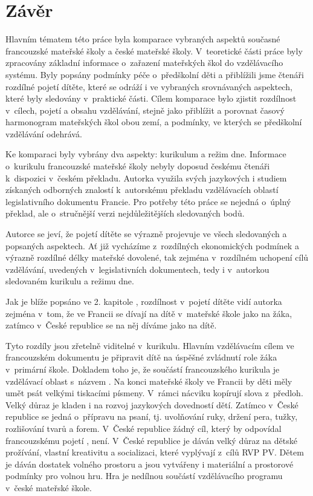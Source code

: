 \chapter*{Závěr}
Hlavním tématem této práce byla komparace vybraných aspektů současné francouzské mateřské školy a české mateřské školy. V~teoretické části práce byly zpracovány základní informace o~zařazení mateřských škol do vzdělávacího systému. Byly popsány podmínky péče o~předškolní děti a přiblížili jsme čtenáři rozdílné pojetí dítěte, které se odráží i ve vybraných srovnávaných aspektech, které byly sledovány v~praktické části. Cílem komparace bylo zjistit rozdílnost v~cílech, pojetí a obsahu vzdělávání, stejně jako přiblížit a porovnat časový harmonogram mateřských škol obou zemí, a podmínky, ve kterých se předškolní vzdělávání odehrává.  

Ke komparaci byly vybrány dva aspekty: kurikulum a režim dne. Informace o~kurikulu francouzské mateřské školy nebyly doposud českému čtenáři k~dispozici v~českém překladu. Autorka využila svých jazykových i studiem získaných odborných znalostí k~autorskému překladu vzdělávacích oblastí legislativního dokumentu Francie. Pro potřeby této práce se nejedná o~úplný překlad, ale o~stručnější verzi nejdůležitějších sledovaných bodů. 

Autorce se jeví, že pojetí dítěte se výrazně projevuje ve všech sledovaných a popsaných aspektech. Ať již vycházíme z~rozdílných ekonomických podmínek a výrazně rozdílné délky mateřské dovolené, tak zejména v~rozdílném uchopení cílů vzdělávání, uvedených v~legislativních dokumentech, tedy i v~autorkou sledovaném kurikulu a režimu dne. 

Jak je blíže popsáno ve 2. kapitole , rozdílnost v~pojetí dítěte vidí autorka zejména v~tom, že ve Francii se dívají na dítě v~mateřské škole jako na žáka, zatímco v~České republice se na něj díváme jako na dítě.   

Tyto rozdíly jsou zřetelně viditelné v~kurikulu. Hlavním vzdělávacím cílem ve francouzském dokumentu je připravit dítě na úspěšné zvládnutí role žáka v~primární škole. Dokladem toho je, že součástí francouzského kurikula je vzdělávací oblast s~názvem . Na konci mateřské školy ve Francii by děti měly umět psát velkými tiskacími písmeny. V~rámci nácviku kopírují slova z~předloh. Velký důraz je kladen i na rozvoj jazykových dovedností dětí. Zatímco v~České republice se jedná o~přípravu na psaní, tj. uvolňování ruky, držení pera, tužky, rozlišování tvarů a forem. V~České republice žádný cíl, který by odpovídal francouzskému pojetí , není. V~České republice je dáván velký důraz na dětské prožívání, vlastní kreativitu a socializaci, které vyplývají z~cílů RVP PV. Dětem je dáván dostatek volného prostoru a jsou vytvářeny i materiální a prostorové podmínky pro volnou hru. Hra je nedílnou součástí vzdělávacího programu v~české mateřské škole. 

